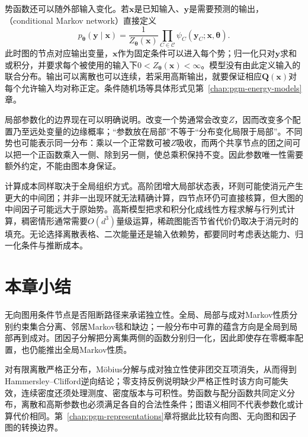 势函数还可以随外部输入变化。若$\bm{x}$是已知输入、$\bm{y}$是需要预测的输出，（conditional Markov network）直接定义
\begin{equation}
  p_{\bm{\theta}}(\bm{y}\mid\bm{x})
  =\frac{1}{Z_{\bm{\theta}}(\bm{x})}
    \prod_{C\in\mathcal{C}}
    \psi_C(\bm{y}_C;\bm{x},\bm{\theta}).
  \label{eq:pgm-undirected-conditional-network}
\end{equation}
此时图的节点对应输出变量，$\bm{x}$作为固定条件可以进入每个势；归一化只对$\bm{y}$求和或积分，并要求每个被使用的输入下$0<Z_{\bm{\theta}}(\bm{x})<\infty$。模型没有由此定义输入的联合分布。输出可以离散也可以连续，若采用高斯输出，就要保证相应$\bm{Q}(\bm{x})$对每个允许输入均对称正定。条件随机场等具体形式见第~\ref{chap:pgm-energy-models}章。

局部参数化的边界现在可以明确说明。改变一个势通常会改变$Z$，因而改变多个配置乃至远处变量的边缘概率；“参数放在局部”不等于“分布变化局限于局部”。不同势也可能表示同一分布：乘以一个正常数可被$Z$吸收，而两个共享节点的团之间可以把一个正函数乘入一侧、除到另一侧，使总乘积保持不变。因此参数唯一性需要额外约定，不能由图本身保证。

计算成本同样取决于全局组织方式。高阶团增大局部状态表，环则可能使消元产生更大的中间团；并非一出现环就无法精确计算，四节点环仍可直接核算，但大图的中间因子可能远大于原始势。高斯模型把求和积分化成线性方程求解与行列式计算，稠密情形通常需要$O(d^3)$量级运算，稀疏图能否节省代价仍取决于消元时的填充。无论选择离散表格、二次能量还是输入依赖势，都要同时考虑表达能力、归一化条件与推断成本。

\section{本章小结}
\label{sec:pgm-undirected-summary}

无向图用条件节点是否阻断路径来承诺独立性。全局、局部与成对Markov性质分别约束集合分离、邻居Markov毯和缺边；一般分布中可靠的蕴含方向是全局到局部再到成对。团因子分解把分离集两侧的函数分别归一化，因此即使存在零概率配置，也仍能推出全局Markov性质。

对有限离散严格正分布，Möbius分解与成对独立性使非团交互项消失，从而得到Hammersley--Clifford逆向结论；零支持反例说明缺少严格正性时该方向可能失效，连续密度还须处理测度、密度版本与可积性。势函数与配分函数共同定义分布，离散和高斯参数也必须满足各自的合法性条件；图语义相同不代表参数化或计算代价相同。第~\ref{chap:pgm-representations}章将据此比较有向图、无向图和因子图的转换边界。
